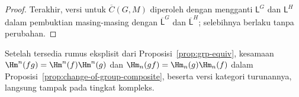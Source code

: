 \begin{proof}
	Terakhir, versi untuk $\overline{C}(G,M)$ diperoleh dengan mengganti
	$\mathsf{L}^G$ dan $\mathsf{L}^H$ dalam pembuktian masing-masing dengan
	$\overline{\mathsf{L}}^G$ dan $\overline{\mathsf{L}}^H$; selebihnya berlaku
	tanpa perubahan.
\end{proof}

Setelah tersedia rumus eksplisit dari Proposisi~\ref{prop:grp-equiv}, kesamaan
$\Hm^n(fg)=\Hm^n(f)\Hm^n(g)$ dan
$\Hm_n(gf)=\Hm_n(g)\Hm_n(f)$ dalam
Proposisi~\ref{prop:change-of-group-composite}, beserta versi kategori
turunannya, langsung tampak pada tingkat kompleks.
